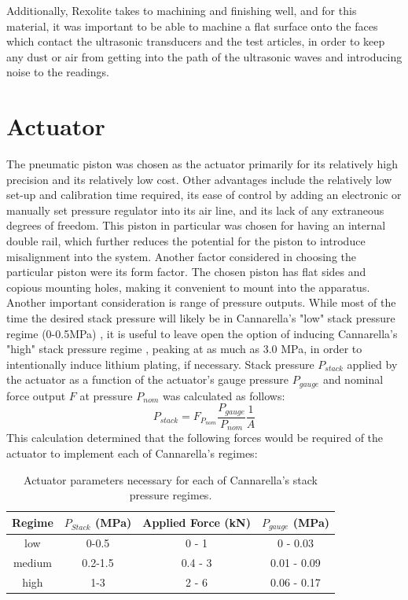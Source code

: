Additionally, Rexolite takes to machining and finishing well, and for this material, it was important to be able to machine a flat surface onto the faces which contact the ultrasonic transducers and the test articles, in order to keep any dust or air from getting into the path of the ultrasonic waves and introducing noise to the readings.
 
\section{Actuator}
The pneumatic piston was chosen as the actuator primarily for its relatively high precision and its relatively low cost. Other advantages include the relatively low set-up and calibration time required, its ease of control by adding an electronic or manually set pressure regulator into its air line, and its lack of any extraneous degrees of freedom. This piston in particular was chosen for having an internal double rail, which further reduces the potential for the piston to introduce misalignment into the system. Another factor considered in choosing the particular piston were its form factor. The chosen piston has flat sides and copious mounting holes, making it convenient to mount into the apparatus. Another important consideration is range of pressure outputs. While most of the time the desired stack pressure will likely be in Cannarella's "low" stack pressure regime (0-0.5MPa) \cite{STACK-STRESS}, it is useful to leave open the option of inducing Cannarella's "high" stack pressure regime \cite{STACK-STRESS}, peaking at as much as 3.0 MPa, in order to intentionally induce lithium plating, if necessary.
Stack pressure $P_{stack}$ applied by the actuator as a function of the actuator's gauge pressure $P_{gauge}$ and nominal force output $F$ at pressure $P_{nom}$ was calculated as follows:
$$P_{stack} = F_{P_{nom}}\frac{P_{gauge}}{P_{nom}}\frac{1}{A} $$
This calculation determined that the following forces would be required of the actuator to implement each of Cannarella's regimes:

\begin{table}[h]
    \centering
    \begin{tabular}{c|c|c|c}
         Regime & $P_{Stack}$ (MPa) & Applied Force (kN) & $P_{gauge}$ (MPa) \\
         \hline
         low & 0-0.5 & 0 - 1 & 0 - 0.03 \\
         medium & 0.2-1.5 & 0.4 - 3 & 0.01 - 0.09 \\
         high & 1-3 & 2 - 6 & 0.06 - 0.17 \\
    \end{tabular}
    \caption{Actuator parameters necessary for each of Cannarella's stack pressure regimes.}
    \label{tab:stackpressure}
\end{table}

